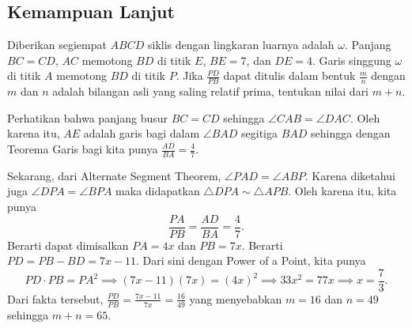 \documentclass[12pt]{scrartcl}
\begin{document}
\subsection{Kemampuan Lanjut}
\begin{soalbaru}
Diberikan segiempat $ABCD$ siklis dengan lingkaran luarnya adalah $\omega$. Panjang $BC=CD$, $AC$ memotong $BD$ di titik $E$, $BE=7$, dan $DE=4$. Garis singgung $\omega$ di titik $A$ memotong $BD$ di titik $P$. Jika $\frac{PD}{PB}$ dapat ditulis dalam bentuk $\frac{m}{n}$ dengan $m$ dan $n$ adalah bilangan asli yang saling relatif prima, tentukan nilai dari $m+n$.
\end{soalbaru}
\begin{solusi}
Perhatikan bahwa panjang busur $BC=CD$ sehingga $\angle CAB = \angle DAC$. Oleh karena itu, $AE$ adalah garis bagi dalam $\angle BAD$ segitiga $BAD$ sehingga dengan Teorema Garis bagi kita punya $\frac{AD}{BA}=\frac{4}{7}$.
\begin{center}
\end{center}
Sekarang, dari Alternate Segment Theorem, $\angle PAD = \angle ABP$. Karena diketahui juga $\angle DPA = \angle BPA$ maka didapatkan $\triangle DPA \sim \triangle APB$. Oleh karena itu, kita punya
$$\frac{PA}{PB} = \frac{AD}{BA} = \frac{4}{7}.$$
Berarti dapat dimisalkan $PA=4x$ dan $PB=7x$. Berarti $PD=PB-BD=7x-11$. Dari sini dengan Power of a Point, kita punya
$$PD \cdot PB = PA^2 \implies (7x-11)(7x) = (4x)^2 \implies 33x^2 = 77x \implies x = \frac{7}{3}.$$
Dari fakta tersebut, $\frac{PD}{PB} = \frac{7x-11}{7x}=\frac{16}{49}$ yang menyebabkan $m=16$ dan $n=49$ sehingga $m+n=\boxed{65}$.
\end{solusi}
\end{document}
